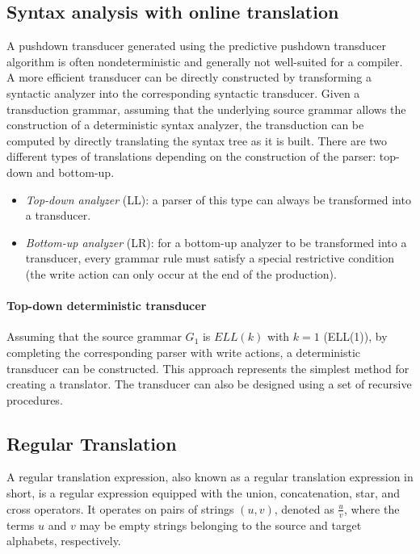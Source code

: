 \subsection{Syntax analysis with online translation}
A pushdown transducer generated using the predictive pushdown transducer algorithm is often nondeterministic and generally not well-suited for a compiler. 
A more efficient transducer can be directly constructed by transforming a syntactic analyzer into the corresponding syntactic transducer. 
Given a transduction grammar, assuming that the underlying source grammar allows the construction of a deterministic syntax analyzer, the transduction can be computed by directly translating the syntax tree as it is built.
There are two different types of translations depending on the construction of the parser: top-down and bottom-up.
\begin{itemize}
    \item \textit{Top-down analyzer} (LL): a parser of this type can always be transformed into a transducer.
    \item \textit{Bottom-up analyzer} (LR): for a bottom-up analyzer to be transformed into a transducer, every grammar rule must satisfy a special restrictive condition (the write action can only occur at the end of the production).
\end{itemize}

\paragraph*{Top-down deterministic transducer}
Assuming that the source grammar $G_1$ is $\textit{ELL}(k)$ with $k = 1$ (ELL(1)), by completing the corresponding parser with write actions, a deterministic transducer can be constructed.
This approach represents the simplest method for creating a translator. 
The transducer can also be designed using a set of recursive procedures.

\subsection{Regular Translation}
A regular translation expression, also known as a regular translation expression in short, is a regular expression equipped with the union, concatenation, star, and cross operators. It operates on pairs of strings $\left( u, v \right)$, denoted as $\frac{u}{v}$, where the terms $u$ and $v$ may be empty strings belonging to the source and target alphabets, respectively.
